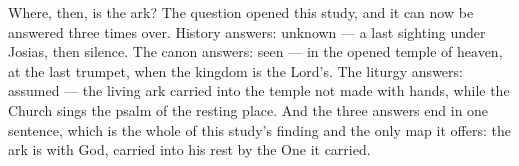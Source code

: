 Where, then, is the ark? The question opened this study, and it can now be
answered three times over. History answers: unknown --- a last sighting
under Josias, then silence. The canon answers: seen --- in the opened
temple of heaven, at the last trumpet, when the kingdom is the Lord's. The
liturgy answers: assumed --- the living ark carried into the temple not
made with hands, while the Church sings the psalm of the resting place. And
the three answers end in one sentence, which is the whole of this study's
finding and the only map it offers: the ark is with God, carried into his
rest by the One it carried.
